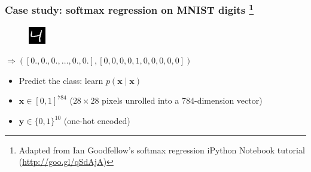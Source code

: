\documentclass[mathserif, xcolor=dvipsnames]{beamer}
\begin{document}
\begin{frame}[t]
    \frametitle{Case study: softmax regression on MNIST digits
                \footnote{Adapted from Ian Goodfellow's softmax regression
                          iPython Notebook tutorial (\url{http://goo.gl/qSdAjA})}}

    \begin{center}
    \begin{minipage}{0.05\textwidth}
    \begin{figure}[H]
        \raggedleft
        \includegraphics[width=\textwidth]{mnist_4.png}
    \end{figure}
    \end{minipage}
    \begin{minipage}{0.9\textwidth}
        \raggedright
        $\Rightarrow ([0., 0., 0., \ldots, 0., 0.],
                      [0, 0, 0, 0, 1, 0, 0, 0, 0, 0])$
    \end{minipage}
    \end{center}

    \begin{itemize}\addtolength{\itemsep}{2.0\baselineskip}
        \item{Predict the class: learn $p(\mathbf{x} \mid \mathbf{x})$}
        \item{$\mathbf{x} \in [0, 1]^{784}$ ($28 \times 28$ pixels unrolled
              into a 784-dimension vector)}
        \item{$\mathbf{y} \in \{0, 1\}^{10}$ (one-hot encoded)}
    \end{itemize}
\end{frame}
\end{document}
